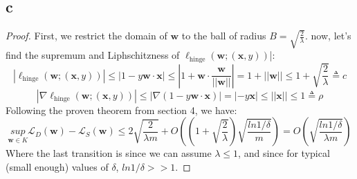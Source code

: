 \subsection*{c}
\begin{proof}
    First, we restrict the domain of $\boldsymbol{w}$ to the ball of radius $B=\sqrt{\frac{2}{\lambda}}$. now, let's find the supremum and Liphschitzness of $\ell_{\text{hinge}}(\boldsymbol{w};(\boldsymbol{x}, y))$|:
    \begin{equation*}
        |\ell_{\text{hinge}}(\boldsymbol{w};(\boldsymbol{x}, y))| \leq |1-y\boldsymbol{w}\cdot\boldsymbol{x}| \leq |1 + \boldsymbol{w}\cdot \frac{\boldsymbol{w}}{||\boldsymbol{w}||}| = 1 + ||\boldsymbol{w}|| \leq 1+\sqrt{\frac{2}{\lambda}} \triangleq c
    \end{equation*}
    \begin{equation*}
        |\nabla \ell_{\text{hinge}}(\boldsymbol{w};(\boldsymbol{x}, y))| \leq |\nabla (1-y\boldsymbol{w}\cdot\boldsymbol{x})| = |-y\boldsymbol{x}| \leq ||\boldsymbol{x}|| \leq 1 \triangleq \rho
    \end{equation*}
    Following the proven theorem from section 4, we have:
    \begin{equation*}
        \underset{\boldsymbol{w} \in K}{sup} \mathcal{L}_D(\boldsymbol{w}) - \mathcal{L}_S(\boldsymbol{w}) \leq 2 \sqrt{\frac{2}{\lambda m}} + O\left((1+\sqrt{\frac{2}{\lambda}}) \sqrt{\frac{ln 1/\delta}{m}} \right)
        = O\left(\sqrt{\frac{ln 1/\delta}{\lambda m}} \right)
    \end{equation*}
    Where the last transition is since we can assume $\lambda \leq 1$, and since for typical (small enough) values of $\delta$, $ln 1/\delta >> 1$.


\end{proof}
